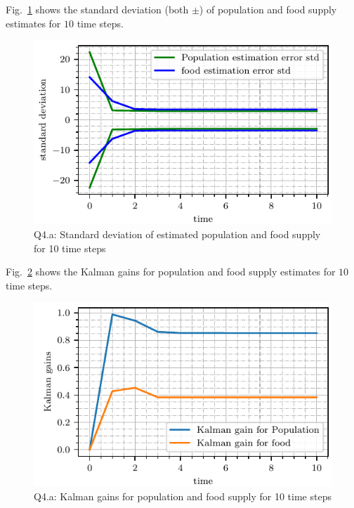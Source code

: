 Fig.~\ref{fig:q4_std_dev} shows the standard deviation (both $\pm$) of population and food supply estimates for $10$ time steps.
\begin{figure}[!h]
	\centering
	\includegraphics[scale=1.0,trim={0cm 0cm 0cm 0cm},clip]{./code/generatedPlots/q4_std_dev.pdf}
	\caption{Q4.a: Standard deviation of estimated population and food supply for 10 time steps}
	\label{fig:q4_std_dev}
\end{figure}
Fig.~\ref{fig:q4_kal_gain} shows the Kalman gains for population and food supply estimates for $10$ time steps.
\begin{figure}[!h]
	\centering
	\includegraphics[scale=1.0,trim={0cm 0cm 0cm 0cm},clip]{./code/generatedPlots/q4_kal_gain.pdf}
	\caption{Q4.a: Kalman gains for population and food supply for 10 time steps}
	\label{fig:q4_kal_gain}
\end{figure}
